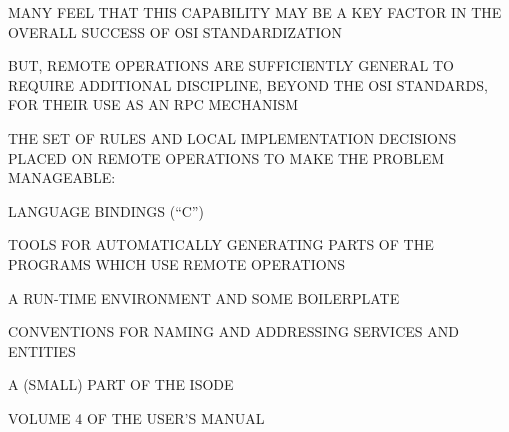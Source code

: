 \begin{bwslide}

\begin{nrtc}
\item	MANY FEEL THAT THIS CAPABILITY MAY BE A KEY FACTOR IN THE OVERALL
	SUCCESS OF OSI STANDARDIZATION

\item	BUT, REMOTE OPERATIONS ARE SUFFICIENTLY GENERAL TO REQUIRE
	ADDITIONAL DISCIPLINE, BEYOND THE OSI STANDARDS,
	FOR THEIR USE AS AN RPC MECHANISM
\end{nrtc}
\end{bwslide}


\begin{bwslide}

\begin{nrtc}
\item	THE SET OF RULES AND LOCAL IMPLEMENTATION DECISIONS PLACED ON REMOTE
	OPERATIONS TO MAKE THE PROBLEM MANAGEABLE:
    \begin{nrtc}
    \item	LANGUAGE BINDINGS (``C'')

    \item	TOOLS FOR AUTOMATICALLY GENERATING PARTS OF THE
		PROGRAMS WHICH USE REMOTE OPERATIONS

    \item	A RUN-TIME ENVIRONMENT AND SOME BOILERPLATE

    \item	CONVENTIONS FOR NAMING AND ADDRESSING SERVICES AND ENTITIES
    \end{nrtc}

\item	A (SMALL) PART OF THE ISODE
    \begin{nrtc}
    \item	VOLUME 4 OF THE USER'S MANUAL
    \end{nrtc}
\end{nrtc}
\end{bwslide}


